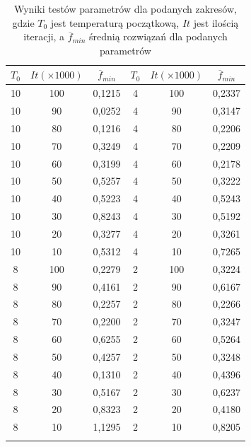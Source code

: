 \documentclass[twoside]{projektInzynierskiMS1}
\newcommand{\si}{ś}
\begin{document}
\begin{table}[htbp]\centering
\def\sym#1{\ifmmode^{#1}\else\(^{#1}\)\fi}
\caption{Wyniki testów parametrów dla podanych zakresów, gdzie $T_0$ jest temperaturą początkową, $It$ jest ilo\si cią iteracji, a $\overline{f}_{min}$ \si rednią rozwiązań dla podanych parametrów}
\begin{tabular}{|c|c|c||c|c|c|} 
                  \hline
                   $T_0$
                  & $It (\times 1000)$
                  &$\overline{f}_{min}$ 
& $T_0$
 & $It(\times 1000)$ 
 &$\overline{f}_{min}$ \\ \hline
10 & 100 & 0,1215 & 4 & 100 & 0,2337 \\ \hline
10 & 90 & 0,0252 & 4 & 90 & 0,3147 \\ \hline
10 & 80 & 0,1216 & 4 & 80 & 0,2206 \\ \hline
10 & 70 & 0,3249& 4 & 70 & 0,2209 \\ \hline 
10 & 60 & 0,3199 & 4 & 60 & 0,2178 \\ \hline 
10 & 50 & 0,5257 & 4 & 50 & 0,3222 \\ \hline
10 & 40 & 0,5223 & 4 & 40 & 0,5243 \\ \hline 
10 & 30 & 0,8243 & 4 & 30 & 0,5192 \\ \hline
10 & 20 & 0,3277 & 4 & 20 & 0,3261 \\ \hline 
10 & 10 & 0,5312 & 4 & 10 & 0,7265 \\ \Xhline{3\arrayrulewidth}

8 & 100 & 0,2279 & 2 & 100 & 0,3224 \\ \hline 
8 & 90 & 0,4161 & 2 & 90 & 0,6167 \\ \hline 
8 & 80 & 0,2257 & 2 & 80 & 0,2266 \\ \hline 
8 & 70 & 0,2200 & 2 & 70 & 0,3247 \\ \hline 
8 & 60 & 0,6255 & 2 & 60 & 0,5264 \\ \hline 
8 & 50 & 0,4257 & 2 & 50 & 0,3248 \\ \hline 
8 & 40 & 0,1310 & 2 & 40 & 0,4396 \\ \hline
8 & 30 & 0,5167 & 2 & 30 & 0,6237 \\ \hline
8 & 20 & 0,8323 & 2 & 20 & 0,4180 \\ \hline
8 & 10 & 1,1295 & 2 & 10 & 0,8205 \\ \Xhline{3\arrayrulewidth}


\end{tabular}
\end{table}
\end{document}
